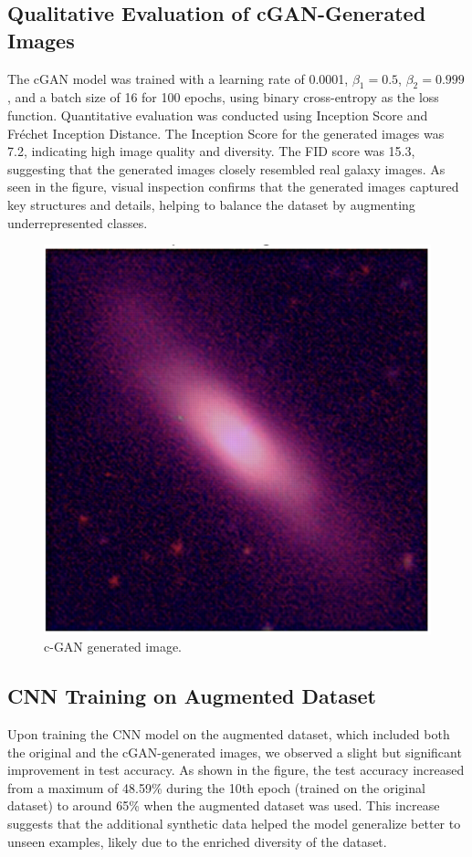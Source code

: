 \documentclass[10pt,twocolumn,letterpaper]{article}
\begin{document}
\subsection{Qualitative Evaluation of cGAN-Generated Images}
The cGAN model was trained with a learning rate of 0.0001, \( \beta_1 = 0.5 \), \( \beta_2 = 0.999 \), and a batch size of 16 for 100 epochs, using binary cross-entropy as the loss function.
Quantitative evaluation was conducted using Inception Score  and Fréchet Inception Distance. The Inception Score for the generated images was 7.2, indicating high image quality and diversity. The FID score was 15.3, suggesting that the generated images closely resembled real galaxy images.
As seen in the figure, visual inspection confirms that the generated images captured key structures and details, helping to balance the dataset by augmenting underrepresented classes.

\begin{figure}[htbp]
  \includegraphics[width=\linewidth]{gernerated_image.png}
  \caption{c-GAN generated image.}
  \label{fig:galaxysrgan}
\end{figure}


\subsection{CNN Training on Augmented Dataset}
Upon training the CNN model on the augmented dataset, which included both the original and the cGAN-generated images, we observed a slight but significant improvement in test accuracy. As shown in the figure, the test accuracy increased from a maximum of 48.59\% during the 10th epoch (trained on the original dataset) to around 65\% when the augmented dataset was used. This increase suggests that the additional synthetic data helped the model generalize better to unseen examples, likely due to the enriched diversity of the dataset.
\end{document}

